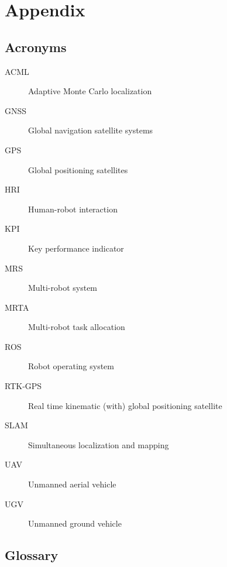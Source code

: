 

    \chapter{Appendix}

 

    \section{Acronyms}
    \begin{description}
        \item[ACML] Adaptive Monte Carlo localization
        \item[GNSS] Global navigation satellite systems
        \item[GPS] Global positioning satellites
        \item[HRI] Human-robot interaction
        \item[KPI] Key performance indicator
        \item[MRS] Multi-robot system
        \item[MRTA] Multi-robot task allocation
        \item[ROS] Robot operating system
        \item[RTK-GPS] Real time kinematic (with) global positioning satellite
        \item[SLAM] Simultaneous localization and mapping
        \item[UAV] Unmanned aerial vehicle
        \item[UGV] Unmanned ground vehicle
    \end{description}
    
    \section{Glossary}
    
